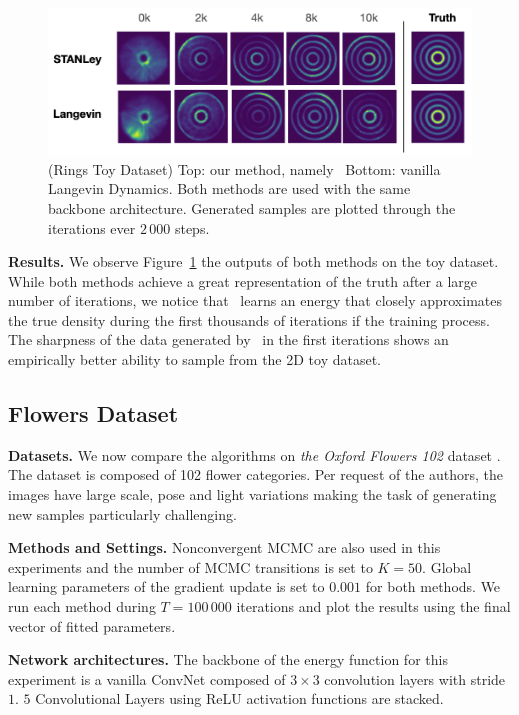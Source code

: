 \documentclass[10pt,twocolumn,letterpaper]{article}
\begin{document}
\begin{figure}[H]
\begin{center}
\includegraphics[width=1.\linewidth]{figs/rings}
\end{center}
   \caption{(Rings Toy Dataset) Top: our method, namely \algo\ Bottom: vanilla Langevin Dynamics. Both methods are used with the same backbone architecture. Generated samples are plotted through the iterations ever $2\,000$ steps.}
\label{fig:resultstoy}
\end{figure}


\textbf{Results.} 
We observe Figure~\ref{fig:resultstoy} the outputs of both methods on the toy dataset.
While both methods achieve a great representation of the truth after a large number of iterations, we notice that \algo\ learns an energy that closely approximates the true density during the first thousands of iterations if the training process.
The sharpness of the data generated by \algo\ in the first iterations shows an empirically better ability to sample from the 2D toy dataset.

\subsection{Flowers Dataset}

\textbf{Datasets.}
We now compare the algorithms on \emph{the Oxford Flowers 102} dataset \cite{nilsback2008automated}.
The dataset is composed of 102 flower categories.
Per request of the authors, the images have large scale, pose and light variations making the task of generating new samples particularly challenging.

\medskip
\textbf{Methods and Settings.}
Nonconvergent MCMC are also used in this experiments and the number of MCMC transitions is set to $K = 50$.
Global learning parameters of the gradient update is set to $0.001$ for both methods.
We run each method during $T = 100\,000$ iterations and plot the results using the final vector of fitted parameters.


\medskip
\textbf{Network architectures.} 
The backbone of the energy function for this experiment is a vanilla ConvNet composed of $3 \times 3$ convolution layers with stride $1$.
$5$ Convolutional Layers using ReLU activation functions are stacked.
\end{document}
